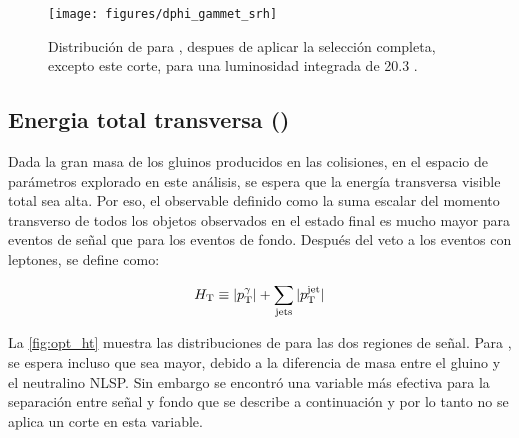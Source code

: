 

\begin{figure}[!htbp]
  \centering

  \texttt{[image: figures/dphi\_gammet\_srh]}

  \caption{Distribución de {\dphijg} para {\SRH}, despues de aplicar la selección completa, excepto este corte,
    para una luminosidad integrada de 20.3 \ifb.}
  \label{fig:opt_dphi_gamjet}
\end{figure}



\subsection{Energia total transversa (\HT)}
\label{sec:ht_obj}

Dada la gran masa de los gluinos producidos en las colisiones, en el espacio de
parámetros explorado en este análisis, se espera que la energía transversa
visible total sea alta. Por eso, el observable {\HT} definido como la suma
escalar del momento transverso de todos los objetos observados en el estado
final es mucho mayor para eventos de señal que para los eventos de fondo.
Después del veto a los eventos con leptones, {\HT} se define como:

\begin{equation}
  H_{\mathrm{T}} \equiv |p_{\mathrm{T}}^{\gamma}| + \sum_{\mathrm{jets}} |p_{\mathrm{T}}^\mathrm{jet}|
  \label{eq:ht_def}
\end{equation}

La \cref{fig:opt_ht} muestra las distribuciones de {\HT} para las dos regiones de señal.
Para {\SRL}, se espera incluso que {\HT} sea mayor, debido a la
diferencia de masa entre el gluino y el neutralino NLSP. Sin embargo
se encontró una variable más efectiva para la separación entre señal y
fondo que se describe a continuación y por lo tanto no se aplica un corte
en esta variable.


